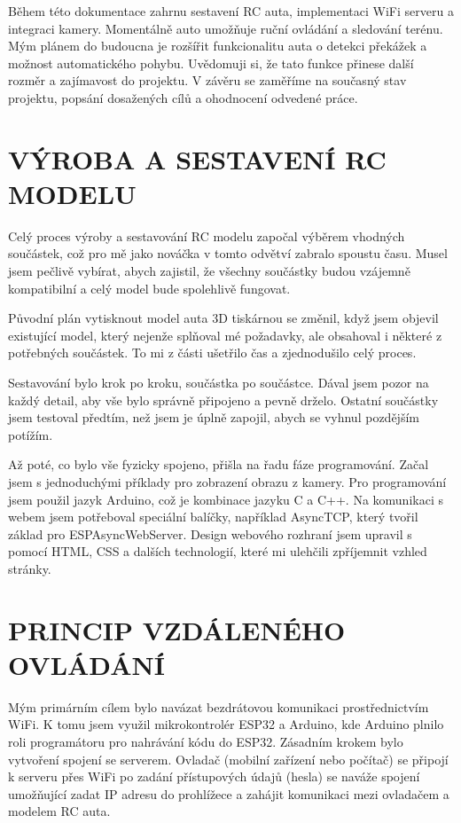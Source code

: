 \documentclass[12pt, a4paper,
oneside,      %
openany
]{report}
\begin{document}
\noindent Během této dokumentace zahrnu sestavení RC auta, implementaci WiFi serveru a integraci kamery. Momentálně auto umožňuje ruční ovládání a sledování terénu. Mým plánem do budoucna je rozšířit funkcionalitu auta o detekci překážek a možnost automatického pohybu. Uvědomuji si, že tato funkce přinese další rozměr a zajímavost do projektu. V závěru se zaměříme na současný stav projektu, popsání dosažených cílů a ohodnocení odvedené práce.


\pagestyle{plain}
\chapter{VÝROBA A SESTAVENÍ RC MODELU}
\noindent Celý proces výroby a sestavování RC modelu započal výběrem vhodných součástek, což pro mě jako nováčka v tomto odvětví zabralo spoustu času. Musel jsem pečlivě vybírat, abych zajistil, že všechny součástky budou vzájemně kompatibilní a celý model bude spolehlivě fungovat.

\noindent Původní plán vytisknout model auta 3D tiskárnou se změnil, když jsem objevil existující model, který nejenže splňoval mé požadavky, ale obsahoval i některé z potřebných součástek. To mi z části ušetřilo čas a zjednodušilo celý proces.

\noindent Sestavování bylo krok po kroku, součástka po součástce. Dával jsem pozor na každý detail, aby vše bylo správně připojeno a pevně drželo. Ostatní součástky jsem testoval předtím, než jsem je úplně zapojil, abych se vyhnul pozdějším potížím.

\noindent Až poté, co bylo vše fyzicky spojeno, přišla na řadu fáze programování. Začal jsem s jednoduchými příklady pro zobrazení obrazu z kamery. Pro programování jsem použil jazyk Arduino, což je kombinace jazyku C a C++. Na komunikaci s webem jsem potřeboval speciální balíčky, například AsyncTCP, který tvořil základ pro ESPAsyncWebServer. Design webového rozhraní jsem upravil s pomocí HTML, CSS a dalších technologií, které mi ulehčili zpříjemnit vzhled stránky.

\chapter{PRINCIP VZDÁLENÉHO OVLÁDÁNÍ}
\noindent Mým primárním cílem bylo navázat bezdrátovou komunikaci prostřednictvím WiFi. K tomu jsem využil mikrokontrolér ESP32 a Arduino, kde Arduino plnilo roli programátoru pro nahrávání kódu do ESP32. Zásadním krokem bylo vytvoření spojení se serverem. Ovladač (mobilní zařízení nebo počítač) se připojí k serveru přes WiFi po zadání přístupových údajů (hesla) se naváže spojení umožňující zadat IP adresu do prohlížece a zahájit komunikaci mezi ovladačem a modelem RC auta.
\end{document}
